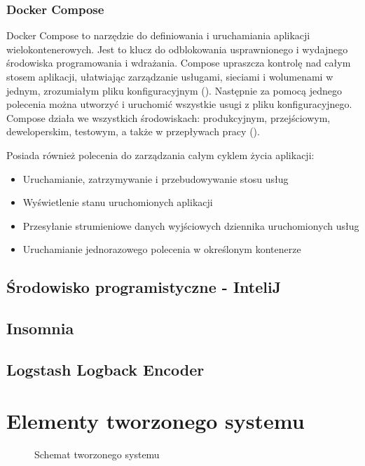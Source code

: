 \subsubsection{Docker Compose}

Docker Compose to narzędzie do definiowania i uruchamiania aplikacji wielokontenerowych. Jest to klucz do odblokowania usprawnionego i wydajnego środowiska programowania i wdrażania.
Compose upraszcza kontrolę nad całym stosem aplikacji, ułatwiając zarządzanie usługami, sieciami i wolumenami w jednym, zrozumiałym pliku konfiguracyjnym  (). Następnie za pomocą jednego polecenia można utworzyć i uruchomić wszystkie usugi z pliku konfiguracyjnego. Compose działa we wszystkich środowiskach: produkcyjnym, przejściowym, deweloperskim, testowym, a także w przepływach pracy  ()\cite{dockerComposeAStudyMultiContainerSystem}\cite{dockerComposeOverview}\cite{dockerComposePaterns}.

Posiada również polecenia do zarządzania całym cyklem życia aplikacji: 
\begin{itemize}
    \item Uruchamianie, zatrzymywanie i przebudowywanie stosu usług
    \item Wyświetlenie stanu uruchomionych aplikacji
    \item Przesyłanie strumieniowe danych wyjściowych dziennika uruchomionych usług
    \item Uruchamianie jednorazowego polecenia w określonym kontenerze
\end{itemize}

\subsection{Środowisko programistyczne - InteliJ}
\subsection{Insomnia}
\subsection{Logstash Logback Encoder}




\newpage
\section{Elementy tworzonego systemu}
\begin{figure}[!htbp]
    \centering
    
    \caption{Schemat tworzonego systemu}
    \label{fig:enter-label}
\end{figure}

